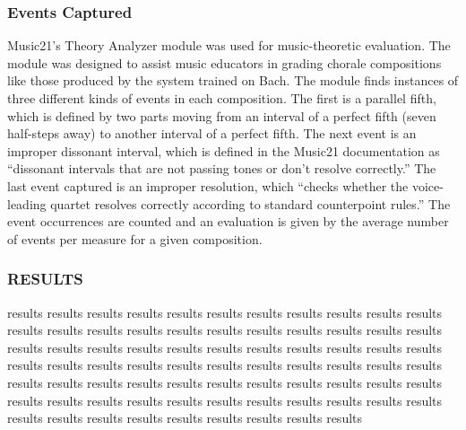 \documentclass{sig-alternate}
\begin{document}
\subsubsection{Events Captured}
Music21's Theory Analyzer module \cite{Cuthbert_music21:a} was used for music-theoretic evaluation. The module was designed to assist music educators in grading chorale compositions like those produced by the system trained on Bach. The module finds instances of three different kinds of events in each composition. The first is a parallel fifth, which is defined by two parts moving from an interval of a perfect fifth (seven half-steps away) to another interval of a perfect fifth. The next event is an improper dissonant interval, which is defined in the Music21 documentation as ``dissonant intervals that are not passing tones or don't resolve correctly.'' The last event captured is an improper resolution, which ``checks whether the voice-leading quartet resolves correctly according to standard counterpoint rules.'' The event occurrences are counted and an evaluation is given by the average number of events per measure for a given composition. 

\subsubsection{RESULTS}

results results results results results results results results results results results results results results results results results results results results results results results results results results results results results results results results results results results results results results results results results results results results results results results results results results results results results results results results results results results results results results results results results results results results results results results results results results results 
\end{document}
